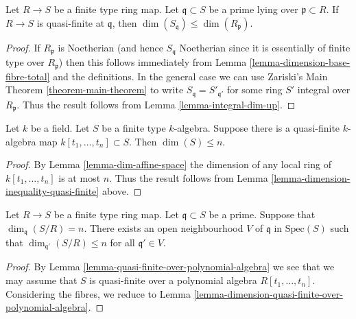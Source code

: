 \begin{lemma}
\label{lemma-dimension-inequality-quasi-finite}
Let $R \to S$ be a finite type ring map.
Let $\mathfrak q \subset S$ be a prime lying over $\mathfrak p \subset R$.
If $R \to S$ is quasi-finite at $\mathfrak q$, then
$\dim(S_{\mathfrak q}) \leq \dim(R_{\mathfrak p})$.
\end{lemma}

\begin{proof}
If $R_{\mathfrak p}$ is Noetherian
(and hence $S_{\mathfrak q}$ Noetherian since it is essentially of
finite type over $R_{\mathfrak p}$)
then this follows immediately from
Lemma \ref{lemma-dimension-base-fibre-total} and the
definitions. In the general case we can use Zariski's Main Theorem
\ref{theorem-main-theorem} to write
$S_{\mathfrak q} = S'_{\mathfrak q'}$ for some
ring $S'$ integral over $R_{\mathfrak p}$.
Thus the result follows from Lemma \ref{lemma-integral-dim-up}.
\end{proof}

\begin{lemma}
\label{lemma-dimension-quasi-finite-over-polynomial-algebra}
Let $k$ be a field. Let $S$ be a finite type $k$-algebra.
Suppose there is a quasi-finite $k$-algebra map
$k[t_1,\ldots,t_n] \subset S$. Then $\dim(S) \leq n$.
\end{lemma}

\begin{proof}
By Lemma \ref{lemma-dim-affine-space} the dimension of
any local ring of $k[t_1, \ldots, t_n]$ is at most $n$.
Thus the result follows from
Lemma \ref{lemma-dimension-inequality-quasi-finite} above.
\end{proof}

\begin{lemma}
\label{lemma-dimension-fibres-bounded-open-upstairs}
Let $R \to S$ be a finite type ring map.
Let $\mathfrak q \subset S$ be a prime.
Suppose that $\dim_{\mathfrak q}(S/R) = n$.
There exists an open neighbourhood $V$ of $\mathfrak q$
in $\text{Spec}(S)$ such that
$\dim_{\mathfrak q'}(S/R) \leq n$ for all $\mathfrak q' \in V$.
\end{lemma}

\begin{proof}
By Lemma \ref{lemma-quasi-finite-over-polynomial-algebra}
we see that we may assume that $S$ is quasi-finite over
a polynomial algebra $R[t_1,\ldots,t_n]$. Considering
the fibres, we reduce to
Lemma \ref{lemma-dimension-quasi-finite-over-polynomial-algebra}.
\end{proof}

